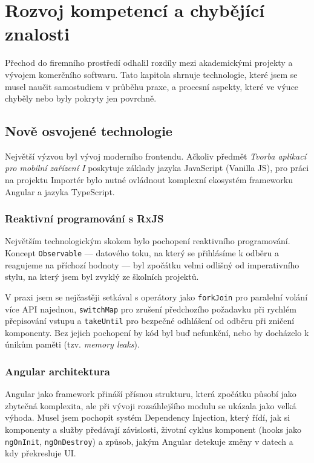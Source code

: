 \chapter{Rozvoj kompetencí a chybějící znalosti}
\label{chap:competencies}

Přechod do firemního prostředí odhalil rozdíly mezi akademickými projekty a vývojem komerčního softwaru. Tato kapitola shrnuje technologie, které jsem se musel naučit samostudiem v průběhu praxe, a procesní aspekty, které ve výuce chyběly nebo byly pokryty jen povrchně.

\section{Nově osvojené technologie}

Největší výzvou byl vývoj moderního frontendu. Ačkoliv předmět \textit{Tvorba aplikací pro mobilní zařízení I} poskytuje základy jazyka JavaScript (Vanilla JS), pro práci na projektu Importér bylo nutné ovládnout komplexní ekosystém frameworku Angular a jazyka TypeScript.

\subsection{Reaktivní programování s RxJS}

Největším technologickým skokem bylo pochopení reaktivního programování. Koncept \texttt{Observable} — datového toku, na který se přihlásíme k odběru a reagujeme na příchozí hodnoty — byl zpočátku velmi odlišný od imperativního stylu, na který jsem byl zvyklý ze školních projektů.

V praxi jsem se nejčastěji setkával s operátory jako \texttt{forkJoin} pro paralelní volání více API najednou, \texttt{switchMap} pro zrušení předchozího požadavku při rychlém přepisování vstupu a \texttt{takeUntil} pro bezpečné odhlášení od odběru při zničení komponenty. Bez jejich pochopení by kód byl buď nefunkční, nebo by docházelo k únikům paměti (tzv. \textit{memory leaks}).

\subsection{Angular architektura}

Angular jako framework přináší přísnou strukturu, která zpočátku působí jako zbytečná komplexita, ale při vývoji rozsáhlejšího modulu se ukázala jako velká výhoda. Musel jsem pochopit systém Dependency Injection, který řídí, jak si komponenty a služby předávají závislosti, životní cyklus komponent (hooks jako \texttt{ngOnInit}, \texttt{ngOnDestroy}) a způsob, jakým Angular detekuje změny v datech a kdy překresluje UI.

